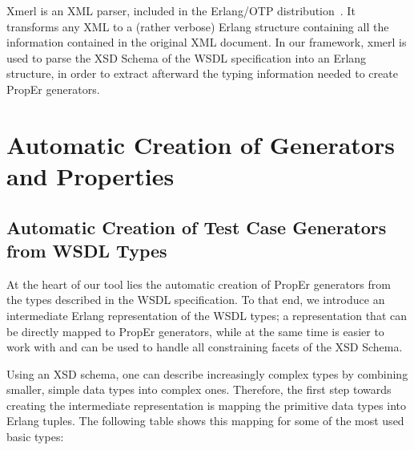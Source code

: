\documentclass[copyright]{eptcs}
\begin{document}
Xmerl is an XML parser, included in the Erlang/OTP distribution~\cite{xmerl}.
It transforms any XML to a (rather verbose) Erlang structure containing all the 
information contained in the original XML document. In our framework, xmerl is 
used to parse the XSD Schema of the WSDL specification into an Erlang structure, in 
order to extract afterward the typing information needed to create PropEr generators.

\section{Automatic Creation of Generators and Properties} \label{sec:automatic}

\subsection{Automatic Creation of Test Case Generators from WSDL Types}

At the heart of our tool lies the automatic creation of PropEr generators from 
the types described in the WSDL specification. To that end, we introduce an 
intermediate Erlang representation of the WSDL types; a representation that can 
be directly mapped to PropEr generators, while at the same time is
easier to work with and can be used to handle all constraining facets
of the XSD Schema.

Using an XSD schema, one can describe increasingly complex types by combining
smaller, simple data types into complex ones. Therefore, the first step towards 
creating the intermediate representation is mapping the primitive data types 
into Erlang tuples. The following table shows this mapping for some of the
most used basic types:
\end{document}
